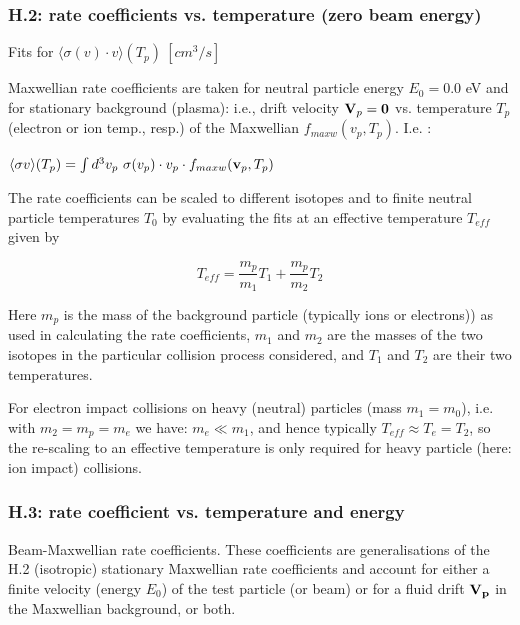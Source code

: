\documentclass[12pt,dvipdfmx]{article}
\begin{document}
\subsubsection{H.2: rate coefficients vs. temperature (zero beam energy)}\label{sec1.3.2}
Fits for $\langle\sigma(v) \cdot v  \rangle (T_p) \ [cm^3/s]$

Maxwellian rate coefficients are taken for neutral particle energy $E_0 = 0.0$ eV and for stationary background (plasma): i.e.,  drift velocity ${\bf V}_p ={\bf 0}$
vs. temperature $T_p$ (electron or ion temp., resp.) of the Maxwellian $f_{maxw}(v_p,T_p)$.
I.e. :

$\langle\sigma v \rangle(T_p) = \int d^3v_p \ \sigma(v_{p}) \cdot v_{p} \cdot
f_{maxw}({\bf v}_{p},T_p)$

The rate coefficients can be scaled to different isotopes and to finite
neutral particle temperatures $T_0$ by evaluating the fits at an
effective temperature $T_{eff}$ given by

\begin{equation}\label{rescale}
T_{eff} = \frac {m_p}{m_1} T_1 + \frac{m_p}{m_2} T_2
\end{equation}

Here $m_p$ is the mass of the background particle (typically ions or electrons)) as used in calculating the rate coefficients,
$m_1$ and $m_2$ are the masses of the two isotopes in the particular collision
process considered, and $T_1$ and $T_2$ are their two temperatures.

For electron impact collisions on heavy (neutral) particles (mass $m_1=m_0$), i.e. with $m_2 =m_p = m_e$  we have:  $m_e \ll m_1$, and hence
typically $T_{eff} \approx T_e = T_2$, so the re-scaling to an effective temperature is only required for heavy particle (here: ion impact) collisions.

\subsubsection{H.3: rate coefficient vs. temperature and energy}\label{sec1.3.3}
Beam-Maxwellian rate coefficients. These coefficients are generalisations of the H.2 (isotropic) stationary Maxwellian rate coefficients and account for either
a finite velocity (energy $E_0$) of the  test particle (or beam) or for a fluid drift ${\bf V_p}$ in the Maxwellian background, or both.
\end{document}

